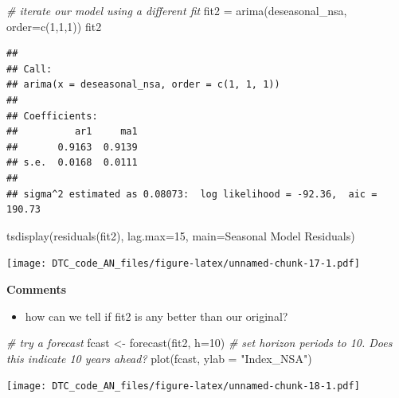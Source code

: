 \documentclass[
]{article}
\newenvironment{Shaded}{\begin{snugshade}}{\end{snugshade}}
\newcommand{\AttributeTok}[1]{\textcolor[rgb]{0.77,0.63,0.00}{#1}}
\newcommand{\CommentTok}[1]{\textcolor[rgb]{0.56,0.35,0.01}{\textit{#1}}}
\newcommand{\DecValTok}[1]{\textcolor[rgb]{0.00,0.00,0.81}{#1}}
\newcommand{\FunctionTok}[1]{\textcolor[rgb]{0.00,0.00,0.00}{#1}}
\newcommand{\NormalTok}[1]{#1}
\newcommand{\OtherTok}[1]{\textcolor[rgb]{0.56,0.35,0.01}{#1}}
\newcommand{\StringTok}[1]{\textcolor[rgb]{0.31,0.60,0.02}{#1}}
\providecommand{\tightlist}{%
  \setlength{\itemsep}{0pt}\setlength{\parskip}{0pt}}
\begin{document}
\begin{Shaded}
\begin{Highlighting}[]
\CommentTok{\# iterate our model using a different fit}
\NormalTok{fit2 }\OtherTok{=} \FunctionTok{arima}\NormalTok{(deseasonal\_nsa, }\AttributeTok{order=}\FunctionTok{c}\NormalTok{(}\DecValTok{1}\NormalTok{,}\DecValTok{1}\NormalTok{,}\DecValTok{1}\NormalTok{))}
\NormalTok{fit2}
\end{Highlighting}
\end{Shaded}

\begin{verbatim}
## 
## Call:
## arima(x = deseasonal_nsa, order = c(1, 1, 1))
## 
## Coefficients:
##          ar1     ma1
##       0.9163  0.9139
## s.e.  0.0168  0.0111
## 
## sigma^2 estimated as 0.08073:  log likelihood = -92.36,  aic = 190.73
\end{verbatim}

\begin{Shaded}
\begin{Highlighting}[]
\FunctionTok{tsdisplay}\NormalTok{(}\FunctionTok{residuals}\NormalTok{(fit2), }\AttributeTok{lag.max=}\DecValTok{15}\NormalTok{, }\AttributeTok{main=}\StringTok{\textquotesingle{}Seasonal Model Residuals\textquotesingle{}}\NormalTok{)}
\end{Highlighting}
\end{Shaded}

\texttt{[image: DTC\_code\_AN\_files/figure-latex/unnamed-chunk-17-1.pdf]}

\textbf{Comments}

\begin{itemize}
\tightlist
\item
  how can we tell if fit2 is any better than our original?
\end{itemize}

\begin{Shaded}
\begin{Highlighting}[]
\CommentTok{\# try a forecast}
\NormalTok{fcast }\OtherTok{\textless{}{-}} \FunctionTok{forecast}\NormalTok{(fit2, }\AttributeTok{h=}\DecValTok{10}\NormalTok{)  }\CommentTok{\# set horizon periods to 10. Does this indicate 10 years ahead?}
\FunctionTok{plot}\NormalTok{(fcast, }\AttributeTok{ylab =} \StringTok{"Index\_NSA"}\NormalTok{)}
\end{Highlighting}
\end{Shaded}

\texttt{[image: DTC\_code\_AN\_files/figure-latex/unnamed-chunk-18-1.pdf]}
\end{document}

